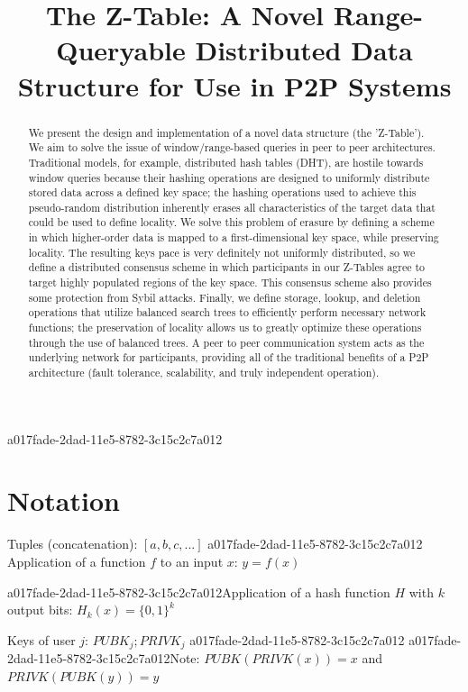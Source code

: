 \documentclass[12pt]{article}
\title{The Z-Table: A Novel Range-Queryable Distributed Data Structure for Use in P2P Systems}
\begin{document}
\maketitle

a017fade-2dad-11e5-8782-3c15c2c7a012\begin{abstract}
We present the design and implementation of a novel data structure (the 'Z-Table'). We aim to solve the issue of window/range-based queries in peer to peer architectures. Traditional models, for example,  distributed hash tables (DHT), are hostile towards window queries because their hashing operations are designed to uniformly distribute stored data across a defined key space; the hashing operations used to achieve this pseudo-random distribution inherently erases all characteristics of the target data that could be used to define locality. We solve this problem of erasure by defining a scheme in which higher-order data is mapped to a first-dimensional key space, while preserving locality. The resulting keys pace is very definitely not uniformly distributed, so we define a distributed consensus scheme in which participants in our Z-Tables agree to target highly populated regions of the key space. This consensus scheme also provides some protection from Sybil attacks. Finally, we define storage, lookup, and deletion operations that utilize balanced search trees to efficiently perform necessary network functions; the preservation of locality allows us to greatly optimize these operations through the use of balanced trees. A peer to peer communication system acts as the underlying network for participants, providing all of the traditional benefits of a P2P architecture (fault tolerance, scalability, and truly independent operation).
\end{abstract}

\section{Notation}

Tuples (concatenation): $[a,b,c,...]$
a017fade-2dad-11e5-8782-3c15c2c7a012
Application of a function $f$ to an input $x$: $y=f(x)$

a017fade-2dad-11e5-8782-3c15c2c7a012Application of a hash function $H$ with $k$ output bits: $H_{k}(x) = \{0,1\}^k$

Keys of user $j$: $ PUBK_j; PRIVK_j $
a017fade-2dad-11e5-8782-3c15c2c7a012
a017fade-2dad-11e5-8782-3c15c2c7a012Note: $PUBK(PRIVK(x)) = x$ and $PRIVK(PUBK(y)) = y$~
\end{document}
